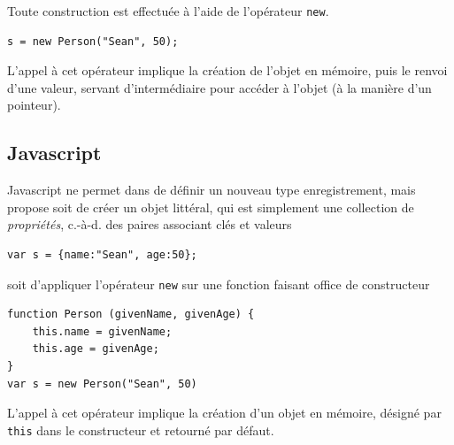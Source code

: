 \documentclass[a4paper,francais]{insalyon}
\newcommand{\cad}{c.-à-d.}
\begin{document}
Toute construction est effectuée à l'aide de l'opérateur \texttt{new}.  
\begin{verbatim}
s = new Person("Sean", 50);  
\end{verbatim}

L'appel à cet opérateur implique la création de l'objet en mémoire, puis le renvoi d'une valeur, servant d'intermédiaire pour accéder à l'objet (à la manière d'un pointeur).

\subsection{Javascript}

Javascript ne permet dans de définir un nouveau type enregistrement, mais propose soit de créer un objet littéral, qui est simplement une collection de \emph{propriétés}, {\cad} des paires associant clés et valeurs  
\begin{verbatim}
var s = {name:"Sean", age:50};
\end{verbatim}
soit d'appliquer l'opérateur \texttt{new} sur une fonction faisant office de constructeur
\begin{verbatim}
function Person (givenName, givenAge) {
    this.name = givenName; 
    this.age = givenAge; 
}
var s = new Person("Sean", 50)
\end{verbatim}
L'appel à cet opérateur implique la création d'un objet en mémoire, désigné par \texttt{this} dans le constructeur et retourné par défaut.



\end{document}
